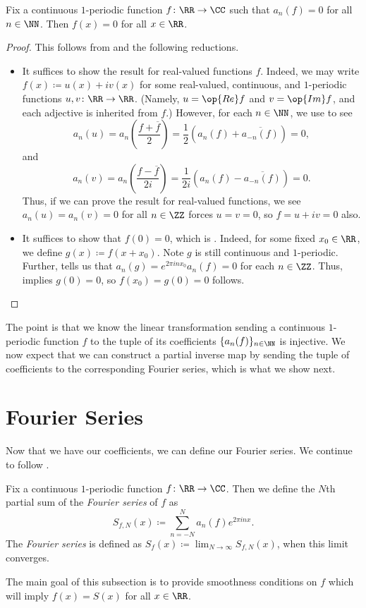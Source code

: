 \documentclass[notes.tex]{subfiles}
\begin{document}
\begin{proposition} \label{prop:get-zero-from-coefs}
	Fix a continuous $1$-periodic function $f\colon\RR\to\CC$ such that $a_n(f)=0$ for all $n\in\NN$. Then $f(x)=0$ for all $x\in\RR$.
\end{proposition}
\begin{proof}
	This follows from  and the following reductions.
	\begin{itemize}
		\item It suffices to show the result for real-valued functions $f$. Indeed, we may write $f(x)\coloneqq u(x)+iv(x)$ for some real-valued, continuous, and $1$-periodic functions $u,v\colon\RR\to\RR$. (Namely, $u=\op{Re}f$ and $v=\op{Im}f$, and each adjective is inherited from $f$.) However, for each $n\in\NN$, we use  to see
		\[a_n(u)=a_n\left(\frac{f+\overline f}2\right)=\frac12\left(a_n(f)+\overline{a_{-n}(f)}\right)=0,\]
		and
		\[a_n(v)=a_n\left(\frac{f-\overline f}{2i}\right)=\frac1{2i}\left(a_n(f)-\overline{a_{-n}(f)}\right)=0.\]
		Thus, if we can prove the result for real-valued functions, we see $a_n(u)=a_n(v)=0$ for all $n\in\ZZ$ forces $u=v=0$, so $f=u+iv=0$ also.
		\item It suffices to show that $f(0)=0$, which is . Indeed, for some fixed $x_0\in\RR$, we define $g(x)\coloneqq f(x+x_0)$. Note $g$ is still continuous and $1$-periodic. Further,  tells us that $a_n(g)=e^{2\pi inx_0}a_n(f)=0$ for each $n\in\ZZ$. Thus,  implies $g(0)=0$, so $f(x_0)=g(0)=0$ follows.
		\qedhere
	\end{itemize}
\end{proof}
The point is that we know the linear transformation sending a continuous $1$-periodic function $f$ to the tuple of its coefficients $\{a_n(f)\}_{n\in\NN}$ is injective. We now expect that we can construct a partial inverse map by sending the tuple of coefficients to the corresponding Fourier series, which is what we show next.

\section{Fourier Series}
Now that we have our coefficients, we can define our Fourier series. We continue to follow \cite[Chapter~2]{stein-fourier-analysis}.
\begin{definition}
	Fix a continuous $1$-periodic function $f\colon\RR\to\CC$. Then we define the $N$th partial sum of the \textit{Fourier series} of $f$ as
	\[S_{f,N}(x)\coloneqq\sum_{n=-N}^Na_n(f)e^{2\pi inx}.\]
	The \textit{Fourier series} is defined as $S_f(x)\coloneqq\lim_{N\to\infty}S_{f,N}(x)$, when this limit converges.
\end{definition}
The main goal of this subsection is to provide smoothness conditions on $f$ which will imply $f(x)=S(x)$ for all $x\in\RR$.
\end{document}
